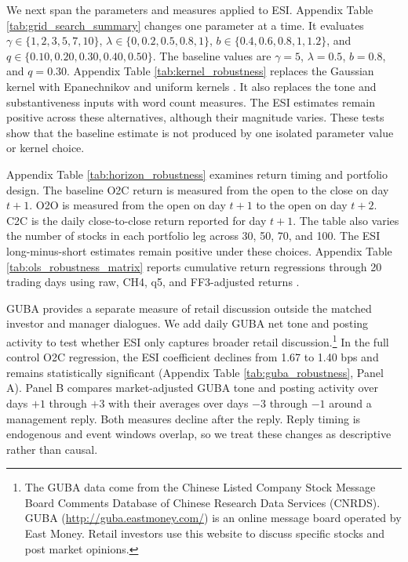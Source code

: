 \documentclass[12pt]{article}
\begin{document}
We next span the parameters and measures applied to ESI. Appendix Table \ref{tab:grid_search_summary} changes one parameter at a time. It evaluates $\gamma \in \{1,2,3,5,7,10\}$, $\lambda \in \{0,0.2,0.5,0.8,1\}$, $b \in \{0.4,0.6,0.8,1,1.2\}$, and $q \in \{0.10,0.20,0.30,0.40,0.50\}$. The baseline values are $\gamma=5$, $\lambda=0.5$, $b=0.8$, and $q=0.30$. Appendix Table \ref{tab:kernel_robustness} replaces the Gaussian kernel with Epanechnikov and uniform kernels \citep{epanechnikov1969}. It also replaces the tone and substantiveness inputs with word count measures. The ESI estimates remain positive across these alternatives, although their magnitude varies. These tests show that the baseline estimate is not produced by one isolated parameter value or kernel choice.

Appendix Table \ref{tab:horizon_robustness} examines return timing and portfolio design. The baseline O2C return is measured from the open to the close on day $t+1$. O2O is measured from the open on day $t+1$ to the open on day $t+2$. C2C is the daily close-to-close return reported for day $t+1$. The table also varies the number of stocks in each portfolio leg across 30, 50, 70, and 100. The ESI long-minus-short estimates remain positive under these choices. Appendix Table \ref{tab:ols_robustness_matrix} reports cumulative return regressions through 20 trading days using raw, CH4, q5, and FF3-adjusted returns \citep{fama1993common,hou2020replicating,liu2019}.

GUBA provides a separate measure of retail discussion outside the matched investor and manager dialogues. We add daily GUBA net tone and posting activity to test whether ESI only captures broader retail discussion.\footnote{The GUBA data come from the Chinese Listed Company Stock Message Board Comments Database of Chinese Research Data Services (CNRDS). GUBA (\url{http://guba.eastmoney.com/}) is an online message board operated by East Money. Retail investors use this website to discuss specific stocks and post market opinions.} In the full control O2C regression, the ESI coefficient declines from 1.67 to 1.40 bps and remains statistically significant (Appendix Table \ref{tab:guba_robustness}, Panel A). Panel B compares market-adjusted GUBA tone and posting activity over days $+1$ through $+3$ with their averages over days $-3$ through $-1$ around a management reply. Both measures decline after the reply. Reply timing is endogenous and event windows overlap, so we treat these changes as descriptive rather than causal.
\end{document}
